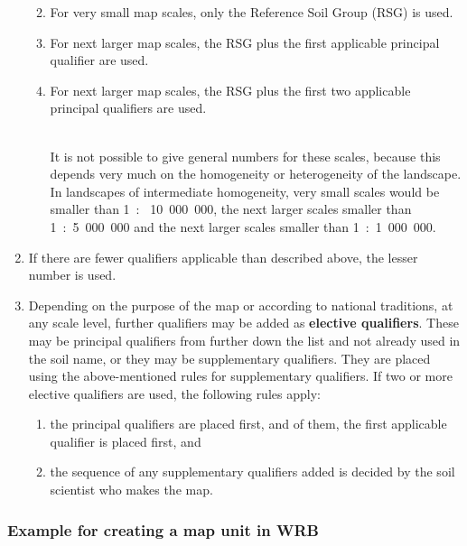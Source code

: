 \documentclass[
  letterpaper,
  DIV=11,
  numbers=noendperiod]{scrreprt}
\providecommand{\tightlist}{%
  \setlength{\itemsep}{0pt}\setlength{\parskip}{0pt}}\usepackage{longtable,booktabs,array}
\begin{document}
\begin{enumerate}
  \begin{enumerate}
  \def\labelenumii{\alph{enumii}.}
  \tightlist
  \item
    For very small map scales, only the Reference Soil Group (RSG) is
    used.
  \item
    For next larger map scales, the RSG plus the first applicable
    principal qualifier are used.
  \item
    For next larger map scales, the RSG plus the first two applicable
    principal qualifiers are used.\\
    \strut \\
    It is not possible to give general numbers for these scales, because
    this depends very much on the homogeneity or heterogeneity of the
    landscape. In landscapes of intermediate homogeneity, very small
    scales would be smaller than 1~: ~10~000~000, the next larger scales
    smaller than 1~:~5~000~000 and the next larger scales smaller than
    1~:~1~000~000.
  \end{enumerate}
\item
  If there are fewer qualifiers applicable than described above, the
  lesser number is used.
\item
  Depending on the purpose of the map or according to national
  traditions, at any scale level, further qualifiers may be added as
  \textbf{elective qualifiers}. These may be principal qualifiers from
  further down the list and not already used in the soil name, or they
  may be supplementary qualifiers. They are placed using the
  above-mentioned rules for supplementary qualifiers. If two or more
  elective qualifiers are used, the following rules apply:

  \begin{enumerate}
  \def\labelenumii{\alph{enumii}.}
  \item
    the principal qualifiers are placed first, and of them, the first
    applicable qualifier is placed first, and
  \item
    the sequence of any supplementary qualifiers added is decided by the
    soil scientist who makes the map.
  \end{enumerate}
\end{enumerate}

\hypertarget{example-for-creating-a-map-unit-in-wrb}{%
\subsubsection{Example for creating a map unit in
WRB}\label{example-for-creating-a-map-unit-in-wrb}}
\end{document}
